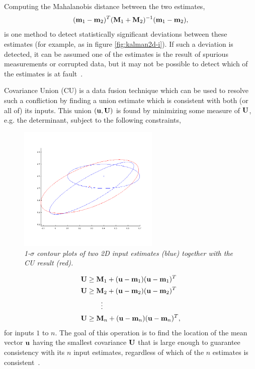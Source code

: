 Computing the Mahalanobis distance between the two estimates,
\begin{equation}\label{eqn:mahalanobis}
(\mathbf{m}_1-\mathbf{m}_2)^T(\mathbf{M}_1+\mathbf{M}_2)^{-1}(\mathbf{m}_1-\mathbf{m}_2),
\end{equation}
is one method to detect statistically significant deviations between these estimates (for example, as in figure
\ref{fig:kalman2d-i}). If such a deviation is detected, it can be assumed one of the estimates is the result of
spurious measurements or corrupted data, but it may not be possible to detect which of the estimates is at
fault~\cite{uhlmann03}.

Covariance Union (CU) is a data fusion technique which can be used to resolve such a confliction by finding a union
estimate which is consistent with both (or all of) its inputs. This union $(\mathbf{u},\mathbf{U})$ is found by minimizing some
measure of $\mathbf{U}$, e.g. the determinant, subject to the following constraints,
\begin{figure}[tbp]
    \centering\includegraphics[width=0.6\textwidth]{figures/cu2d.png}
    \caption{\it 1-$\sigma$ contour plots of two 2D input estimates (blue) together with the CU result (red).}
    \label{fig:cu2d}
\end{figure}
\begin{align}
    \mathbf{U}   &\geq   \mathbf{M}_1 + (\mathbf{u}-\mathbf{m}_1)(\mathbf{u}-\mathbf{m}_1)^T\nonumber\\
    \mathbf{U}   &\geq   \mathbf{M}_2 + (\mathbf{u}-\mathbf{m}_2)(\mathbf{u}-\mathbf{m}_2)^T\nonumber\\
    ~       &\qquad\vdots\nonumber\\
    \mathbf{U}   &\geq   \mathbf{M}_n + (\mathbf{u}-\mathbf{m}_n)(\mathbf{u}-\mathbf{m}_n)^T,\label{eqn:cu}
\end{align}
for inputs $1$ to $n$. The goal of this operation is to find the location of the mean vector $\mathbf{u}$ having the smallest
covariance $\mathbf{U}$ that is large enough to guarantee consistency with its $n$ input estimates, regardless of which of the
$n$ estimates is consistent~\cite{fusion06,uhlmann03}.

